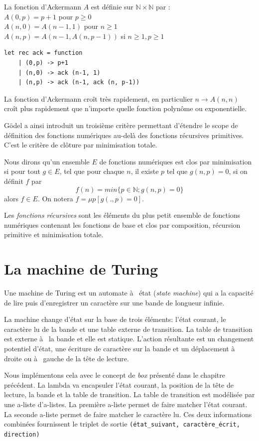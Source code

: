 \documentclass[11pt]{book}
\begin{document}
La fonction d’Ackermann $A$ est définie sur $\mathbb{N} × \mathbb{N}$ par : \\
$A(0, p) = p + 1$ pour $p ≥ 0$ \\
$A(n, 0) = A(n − 1, 1)$ pour $n ≥ 1$ \\
$A(n, p) = A(n − 1, A(n, p − 1))$ si $n ≥ 1, p ≥ 1$ \\ 

\begin{Verbatim}
let rec ack = function
	| (0,p) -> p+1
	| (n,0) -> ack (n-1, 1)
	| (n,p) -> ack (n-1, ack (n, p-1))
\end{Verbatim}

La fonction d’Ackermann croît très rapidement, en particulier $n \rightarrow A(n, n)$ croît
plus rapidement que n’importe quelle fonction polynôme ou exponentielle.

Gödel a ainsi introduit un troisième critère permettant d'étendre le scope de définition des
fonctions numériques au-delà des fonctions récursives primitives. C'est le critère
de clôture par minimisation totale.

Nous dirons qu'un ensemble $E$ de fonctions numériques est clos par minimisation si
pour tout $g \in E$, tel que pour chaque $n$, il existe $p$ tel que $g(n,p)=0$, si on définit
$f$ par
$$ f(n) = min\{p\in \mathbb{N} ; g(n,p) = 0   \} $$
alors $f\in E$. On notera $f =\mu p [g(.,p)=0]$.

Les  \textit{fonctions récursives} sont les éléments du plus petit ensemble de fonctions
numériques contenant les fonctions de base et clos par composition, récursion primitive et 
minimisation totale.

\section{La machine de Turing}
Une machine de Turing est un automate à  état (\textit{state machine}) qui a la
capacité de lire puis  d'enregistrer un caractère sur une bande de longueur
infinie. 

La machine change d'état sur la base de trois éléments: l'état courant,
le caractère lu de la bande et une table externe de transition. La table de
transition est externe à  la bande et elle est statique.
 L'action résultante est un changement potentiel d'état, une écriture de
 caractère sur la bande et un déplacement à  droite ou à  gauche de la tête de
 lecture.

Nous implémentons cela avec le concept de \textit{box} présenté dans le chapitre
précédent. La lambda va encapsuler l'état courant, la position de la tête de
lecture, la bande et la table de transition.
La table de transition est modélisée par une a-liste d'a-listes.
La première a-liste permet de faire matcher l'état courant.
La seconde a-liste permet de faire matcher le caractère lu.
Ces deux informations combinées fournissent  le triplet de sortie
\verb+(état_suivant, caractère_écrit, direction)+
\end{document}

